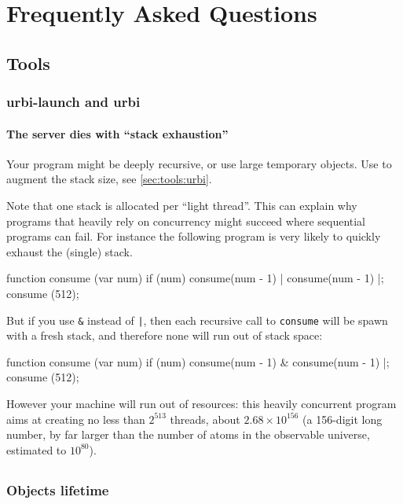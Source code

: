 \chapter{Frequently Asked Questions}
\label{sec:faq}

\section{Tools}
\subsection{urbi-launch and urbi}
\subsubsection{The server dies with ``stack exhaustion''}
Your program might be deeply recursive, or use large temporary
objects.  Use  to augment the stack size, see
\autoref{sec:tools:urbi}.

Note that one stack is allocated per ``light thread''.  This can
explain why programs that heavily rely on concurrency might succeed
where sequential programs can fail.  For instance the following
program is very likely to quickly exhaust the (single) stack.

\begin{urbiunchecked}
function consume (var num)
{
  if (num)
    consume(num - 1) | consume(num - 1)
}|;
consume (512);
\end{urbiunchecked}

But if you use \lstinline{&} instead of \lstinline{|}, then each
recursive call to \lstinline{consume} will be spawn with a fresh
stack, and therefore none will run out of stack space:

\begin{urbiunchecked}
function consume (var num)
{
  if (num)
    consume(num - 1) & consume(num - 1)
}|;
consume (512);
\end{urbiunchecked}

However your machine will run out of resources: this heavily
concurrent program aims at creating no less than $2^{513}$ threads,
about $2.68 \times 10^{156}$ (a 156-digit long number, by far larger
than the number of atoms in the observable universe, estimated to
$10^{80}$).

\section{\us}
\subsection{Objects lifetime}

